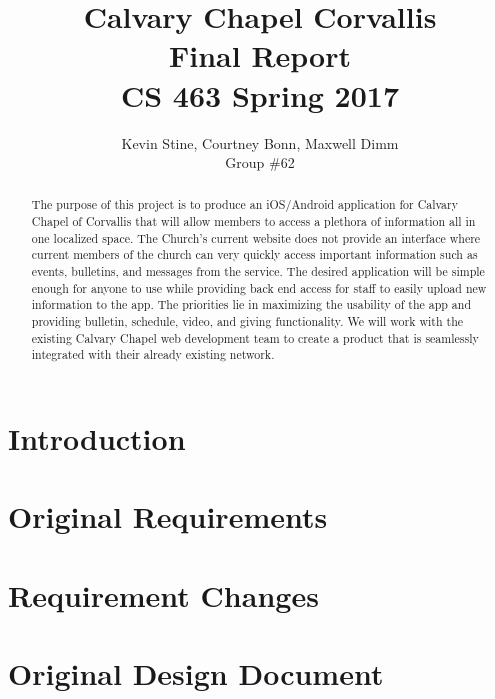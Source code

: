 \documentclass[letterpaper,10pt,draftclsnofoot,onecolumn,titlepage]{IEEEtran}
\def\name{Kevin Stine, Courtney Bonn, Maxwell Dimm}
\def\team{Calvary Chapel Corvallis}
\def\grp{Group \#62}
\begin{document}
	\title{\huge \team \\ Final Report\\ CS 463 Spring 2017}
	\author{\large \name \\ \grp}



	\maketitle

		\begin{abstract}The purpose of this project is to produce an iOS/Android application for Calvary Chapel of Corvallis that will allow members to access a plethora of information all in one localized space.
		The Church's current website does not provide an interface where current members of the church can very quickly access important information such as events, bulletins, and messages from the service.
		The desired application will be simple enough for anyone to use while providing back end access for staff to easily upload new information to the app.
		The priorities lie in maximizing the usability of the app and providing bulletin, schedule, video, and giving functionality.
		We will work with the existing Calvary Chapel web development team to create a product that is seamlessly integrated with their already existing network.
		\end{abstract}

		\clearpage
		
		\tableofcontents
		
		\clearpage

\section{Introduction}

\section{Original Requirements}

	

\section{Requirement Changes}

\section{Original Design Document}
\end{document}
